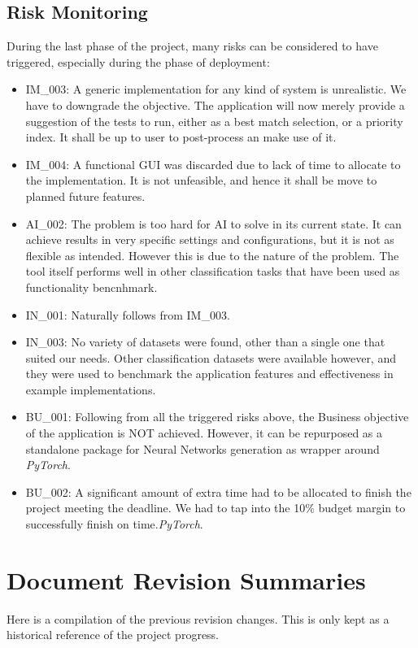 \documentclass[a4paper, 11pt]{report}
\begin{document}
\section{Risk Monitoring} \label{apx:Project Monitoring}
During the last phase of the project, many risks can be considered to have triggered, especially during the phase of deployment:
\begin{itemize}
\item IM\_003: A generic implementation for any kind of system is unrealistic. We have to downgrade the objective. The application will now merely provide a suggestion of the tests to run, either as a best match selection, or a priority index. It shall be up to user to post-process an make use of it.
\item IM\_004: A functional GUI was discarded due to lack of time to allocate to the implementation. It is not unfeasible, and hence it shall be move to planned future features.
\item AI\_002: The problem is too hard for AI to solve in its current state. It can achieve results in very specific settings and configurations, but it is not as flexible as intended. However this is due to the nature of the problem. The tool itself performs well in other classification tasks that have been used as functionality bencnhmark.
\item IN\_001: Naturally follows from IM\_003.
\item IN\_003: No variety of datasets were found, other than a single one that suited our needs. Other classification datasets were available however, and they were used to benchmark the application features and effectiveness in example implementations.
\item BU\_001: Following from all the triggered risks above, the Business objective of the application is NOT achieved. However, it can be repurposed as a standalone package for Neural Networks generation as wrapper around \textit{PyTorch}.
\item BU\_002: A  significant amount of extra time had to be allocated to finish the project meeting the deadline. We had to tap into the 10\% budget margin to successfully finish on time.\textit{PyTorch}.
\end{itemize}


    \chapter{Document Revision Summaries}
    Here is a compilation of the previous revision changes. This is only kept as a historical reference of the project progress.
\end{document}
